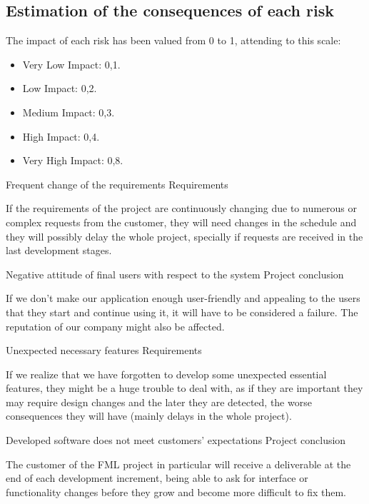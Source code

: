 \subsection{Estimation of the consequences of each risk}

The impact of each risk has been valued from 0 to 1, attending to this scale:
\begin{itemize}
\item Very Low Impact: 0,1.
\item Low Impact: 0,2.
\item Medium Impact: 0,3.
\item High Impact: 0,4.
\item Very High Impact: 0,8.
\end{itemize}

\begin{risk}{Frequent change of the requirements}
\riskcat Requirements

If the requirements of the project are continuously changing due to numerous or complex requests from the customer, they will need changes in the schedule and they will possibly delay the whole project, specially if requests are received in the last development stages.
\end{risk}

\begin{risk}{Negative attitude of final users with respect to the system}
\riskcat Project conclusion

If we don't make our application enough user-friendly and appealing to the users that they start and continue using it, it will have to be considered a failure. The reputation of our company might also be affected.
\end{risk}

\begin{risk}{Unexpected necessary features}
\riskcat Requirements

If we realize that we have forgotten to develop some unexpected essential features, they might be a huge trouble to deal with, as if they are important they may require design changes and the later they are detected, the worse consequences they will have (mainly delays in the whole project).
\end{risk}

\begin{risk}{Developed software does not meet customers' expectations}
\riskcat Project conclusion

The customer of the FML project in particular will receive a deliverable at the end of each development increment, being able to ask for interface or functionality changes before they grow and become more difficult to fix them.
\end{risk}

